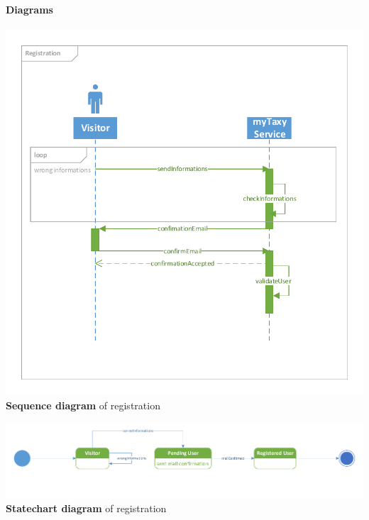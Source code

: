 \paragraph{Diagrams}
	\begin{center}
		\includegraphics[width=\textwidth]{diagrams/registration}
		\textbf{Sequence diagram} of registration
	\end{center}
	\begin{center}
		\includegraphics[width=\textwidth]{diagrams/registration_state}
		\textbf{Statechart diagram} of registration
	\end{center}

